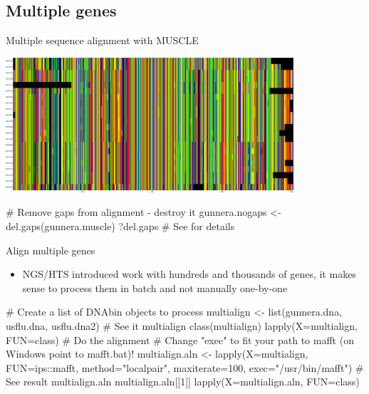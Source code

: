 \documentclass[compress, ucs, xelatex, 11pt, xcolor=svgnames, aspectratio=169,
	hyperref={
		bookmarks=true,
		unicode=true,
		colorlinks=true,
		pdftitle={Molecular data in R},
		plainpages=false,
		pdfauthor={Vojtech Zeisek},
		pdfsubject={Course about phylogeny and evolution in R},
		pdfcreator={XeLaTeX},
		pdfkeywords={R, evolution, phylogeny, molecular data},
		linkcolor=Crimson, %
		anchorcolor=Magenta, %
		citecolor=Magenta, %
		filecolor=Magenta, %
		menucolor=Magenta, %
		urlcolor=DodgerBlue, %
		pdftex},
	url={hyphens, lowtilde} %
	]{beamer}
\begin{document}
\subsection{Multiple genes}

\begin{frame}[fragile]{Multiple sequence alignment with MUSCLE}
	\begin{center}
		\includegraphics[height=5cm]{muscle.png}
	\end{center}
	\vfil
	\begin{spluscode}
    # Remove gaps from alignment - destroy it
    gunnera.nogaps <- del.gaps(gunnera.muscle)
    ?del.gaps # See for details
	\end{spluscode}
	\vfill
\end{frame}

\begin{frame}[fragile]{Align multiple genes}
	\begin{itemize}
		\item NGS/HTS introduced work with hundreds and thousands of genes, it makes sense to process them in batch and not manually one-by-one
	\end{itemize}
	\begin{spluscode}
    # Create a list of DNAbin objects to process
    multialign <- list(gunnera.dna, usflu.dna, usflu.dna2)
    # See it
    multialign
    class(multialign)
    lapply(X=multialign, FUN=class)
    # Do the alignment
    # Change "exec" to fit your path to mafft (on Windows point to mafft.bat)!
    multialign.aln <- lapply(X=multialign, FUN=ips::mafft, method="localpair",
      maxiterate=100, exec="/usr/bin/mafft")
    # See result
    multialign.aln
    multialign.aln[[1]]
    lapply(X=multialign.aln, FUN=class)
	\end{spluscode}
\end{frame}
\end{document}
